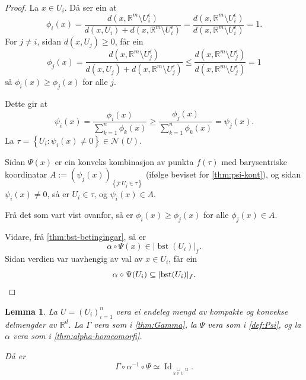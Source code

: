 \documentclass[a4paper, 12pt, norsk]{article}
\theoremstyle{plain}
\newtheorem{lemma}[theorem]{Lemma}
\theoremstyle{definition}
\newcommand{\Rb}{\mathbb{R}}
\newcommand{\Nc}{\mathcal{N}}
\newcommand{\union}{ \mathop{\cup}\limits }
\newcommand{\gr}[1]{ \lvert #1 \rvert } %
\newcommand{\set}[1]{ \left\{ #1 \right\} } %
\newcommand{\tuple}[1]{ \left( #1 \right) } %
\DeclareMathOperator{\bst}{bst} %
\DeclareMathOperator{\Id}{Id} %
\begin{document}
\begin{proof}
	La \( x \in U_i \). Då ser ein at
	\[
		\phi_i(x) = \frac{d(x, \Rb^m \setminus U_i^\epsilon)}{d(x, U_i) + d(x, \Rb^m \setminus U_i^\epsilon)} = \frac{d(x, \Rb^m \setminus U_i^\epsilon)}{d(x, \Rb^m \setminus U_i^\epsilon)} = 1.
	\] 
	For \( j \neq i \), sidan \( d(x, U_j) \geq 0 \), får ein
	\[
		\phi_j(x) = \frac{d(x, \Rb^m \setminus U_j^\epsilon)}{d(x, U_j) + d(x, \Rb^m \setminus U_j^\epsilon)} \leq \frac{d(x, \Rb^m \setminus U_j^\epsilon)}{d(x, \Rb^m \setminus U_j^\epsilon)} = 1
	\]
	så \( \phi_i(x) \geq \phi_j(x) \) for alle \( j \).

	Dette gir at
	\[
		\psi_i(x) = \frac{\phi_i(x)}{\sum_{k=1}^n \phi_k(x)} \geq \frac{\phi_j(x)}{\sum_{k=1}^n \phi_k(x)} = \psi_j(x).
	\]
	La \( \tau = \set{U_i : \psi_i(x) \neq 0} \in \Nc(U) \).

	Sidan \( \Psi(x) \) er ein konveks kombinasjon av punkta \( f(\tau) \) med barysentriske koordinatar \( A:= \tuple{\psi_j(x)}_{\set{ j : U_j\in \tau}} \) (ifølge beviset for \autoref{thm:psi-kont}), og sidan \( \psi_i(x) \neq 0 \), så er \( U_i \in \tau \), og \( \psi_i(x) \in A \).
	
	Frå det som vart vist ovanfor, så er \( \phi_i(x) \geq \phi_j(x) \) for alle \( \phi_j(x) \in A \).
	
	Vidare, frå \autoref{thm:bst-betingingar}, så er
	\[
		\alpha \circ \Psi(x) \in \gr{\bst(U_i)}_f.
	\]
	Sidan verdien var uavhengig av val av \( x \in U_i \), får ein
	\[
		\alpha \circ \Psi(U_i) \subseteq \gr{\bst(U_i)}_f. \qedhere
	\]
\end{proof}

\begin{lemma} \label{thm:homeq-u}
	La \( U = \tuple{U_i}_{i=1}^n \) vera ei endeleg mengd av kompakte og konvekse delmengder av \( \Rb^d \). La \( \Gamma \) vera som i \autoref{thm:Gamma}, la \( \Psi \) vera som i \autoref{def:Psi}, og la \( \alpha \) vera som i \autoref{thm:alpha-homeomorfi}. 
	
	Då er
	\[
		\Gamma \circ \alpha^{-1} \circ \Psi \simeq \Id_{\union_{u \in U} u}.
	\]
\end{lemma}
\end{document}
